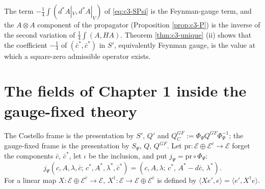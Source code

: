 \begin{remark}
\label{rem:c3-feynman}
The term $-\tfrac14\int(d^*A|_V,d^*A|_V)$ of \eqref{eq:c3-SPsi} is the Feynman-gauge term, and the $A\otimes A$ component of the propagator (Proposition \ref{prop:c3-P}) is the inverse of the second variation of $\tfrac14\int(A,HA)$. Theorem \ref{thm:c3-unique} (ii) shows that the coefficient $-\tfrac14$ of $(\bar c^*,\bar c^*)$ in $S'$, equivalently Feynman gauge, is the value at which a square-zero admissible operator exists.
\end{remark}

\section{The fields of Chapter 1 inside the gauge-fixed theory}

The Costello frame is the presentation by $S'$, $Q'$ and $Q^{GF}_C:=\Phi_\Psi Q^{GF}\Phi_\Psi^{-1}$; the gauge-fixed frame is the presentation by $S_\Psi$, $Q$, $Q^{GF}$. Let $\mathrm{pr}\colon\mathscr E\oplus\mathscr E^{\bar c}\to\mathscr E$ forget the components $\bar c$, $\bar c^*$, let $\iota$ be the inclusion, and put $j_\Psi=\mathrm{pr}\circ\Phi_\Psi$:
\[
j_\Psi(c,A,\lambda,\bar c;\,c^*,A^*,\lambda^*,\bar c^*)=(c,A,\lambda;\,c^*,\,A^*-d\bar c,\,\lambda^*).
\]
For a linear map $X\colon\mathscr E\oplus\mathscr E^{\bar c}\to\mathscr E$, $X^\dagger\colon\mathscr E\to\mathscr E\oplus\mathscr E^{\bar c}$ is defined by $\langle Xe',e\rangle=\langle e',X^\dagger e\rangle$.


